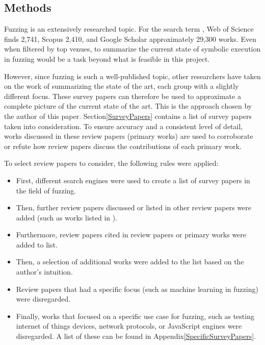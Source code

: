 \documentclass{article}
\begin{document}
\begin{multicols}{2}
    \section{Methods}
    \label{Methods}
    Fuzzing is an extensively researched topic. For the search term , Web of Science\cite{WebOfScience} finds 2,741, Scopus\cite{Scopus} 2,410, and Google Scholar\cite{GoogleScholar} approximately 29,300 works. Even when filtered by top venues, to summarize the current state of symbolic execution in fuzzing would be a task beyond what is feasible in this project.

    However, since fuzzing is such a well-published topic, other researchers have taken on the work of summarizing the state of the art, each group with a slightly different focus. These survey papers can therefore be used to approximate a complete picture of the current state of the art. This is the approach chosen by the author of this paper. Section\ref{SurveyPapers} contains a list of survey papers taken into consideration. To ensure accuracy and a consistent level of detail, works discussed in these review papers (primary works) are used to corroborate or refute how review papers discuss the contributions of each primary work.

    To select review papers to consider, the following rules were applied:
    \begin{itemize}
        \item First, different search engines were used to create a list of survey papers in the field of fuzzing.
        \item Then, further review papers discussed or listed in other review papers were added (such as works listed in \cite{Demystifying}).
        \item Furthermore, review papers cited in review papers or primary works were added to list.
        \item Then, a selection of additional works were added to the list based on the author's intuition.
        \item Review papers that had a specific focus (such as machine learning in fuzzing\cite{ML1, ML2}) were disregarded.
        \item Finally, works that focused on a specific use case for fuzzing, such as testing internet of things devices, network protocols, or JavaScript engines were disregarded. A list of these can be found in Appendix\ref{SpecificSurveyPapers}.
    \end{itemize}


\end{multicols}
\end{document}
